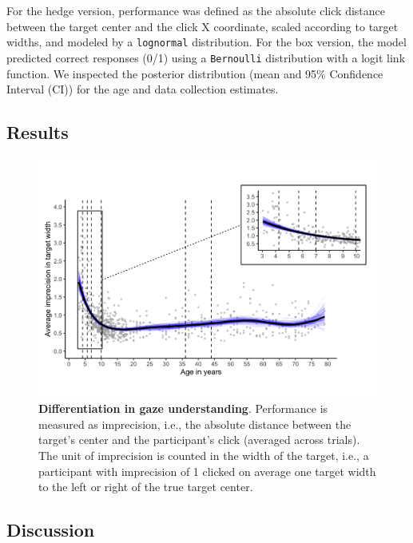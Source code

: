 \documentclass[
  man,floatsintext]{apa6}
\begin{document}
For the hedge version, performance was defined as the absolute click distance between the target center and the click X coordinate, scaled according to target widths, and modeled by a \texttt{lognormal} distribution.
For the box version, the model predicted correct responses (0/1) using a \texttt{Bernoulli} distribution with a logit link function.
We inspected the posterior distribution (mean and 95\% Confidence Interval (CI)) for the age and data collection estimates.

\hypertarget{results}{%
\subsection{Results}\label{results}}



\begin{figure}

{\centering \includegraphics[width=1\linewidth]{../figures/lifespan_plot} 

}

\caption{\textbf{Differentiation in gaze understanding}. Performance is measured as imprecision, i.e., the absolute distance between the target's center and the participant's click (averaged across trials). The unit of imprecision is counted in the width of the target, i.e., a participant with imprecision of 1 clicked on average one target width to the left or right of the true target center.}\label{fig:fig2}
\end{figure}

\hypertarget{discussion}{%
\subsection{Discussion}\label{discussion}}
\end{document}

